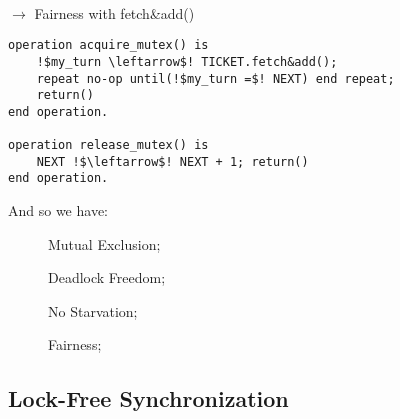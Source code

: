 \paragraph{} {\large $\rightarrow$ Fairness with fetch\&add()}\\
\begin{minipage}{0.75\textwidth}
    \begin{tcolorbox}[colback=nightblue!5!white, colframe=nightblue!75!black]
        \begin{lstlisting}[label={lst:mutex3}, morekeywords={operation, repeat, until, is, if, then, else, end, procedure}, numbers=none, escapechar=!]
operation acquire_mutex() is
    !$my_turn \leftarrow$! TICKET.fetch&add();
    repeat no-op until(!$my_turn =$! NEXT) end repeat;
    return()
end operation.

operation release_mutex() is
    NEXT !$\leftarrow$! NEXT + 1; return()
end operation.\end{lstlisting}
    \end{tcolorbox}
\end{minipage}
\hfill\vrule\hfill
\begin{minipage}{0.2\textwidth}
    \centering
    \par And so we have:
    \begin{description}
        \item[\cmark] Mutual Exclusion;
        \item[\cmark] Deadlock Freedom;
        \item[\cmark] No Starvation;
        \item[\cmark] Fairness;
    \end{description}
\end{minipage}
%
%

    \subsection{Lock-Free Synchronization}

